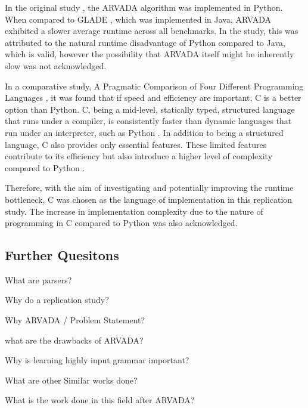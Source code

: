 In the original study \cite{kulkarniLearningHighlyRecursive2021}, the ARVADA algorithm was implemented in Python. When compared to GLADE \cite{bastaniSynthesizingProgramInput}, which was implemented in Java, ARVADA exhibited a slower average runtime across all benchmarks. In the study, this was attributed to the natural runtime disadvantage of Python compared to Java, which is valid, however the possibility that ARVADA itself might be inherently slow was not acknowledged.

\vspace{\baselineskip}

In a comparative study, A Pragmatic Comparison of Four Different Programming Languages \cite{aliPragmaticComparisonFour2021}, it was found that if speed and efficiency are important, C is a better option than Python. C, being a mid-level, statically typed, structured language that runs under a compiler, is consistently faster than dynamic languages that run under an interpreter, such as Python \cite{kumarPythonLanguageComparison2022}. In addition to being a structured language, C also provides only essential features. These limited features contribute to its efficiency but also introduce a higher level of complexity compared to Python \cite{aliPragmaticComparisonFour2021, kumarPythonLanguageComparison2022}.

\vspace{\baselineskip}

Therefore, with the aim of investigating and potentially improving the runtime bottleneck, C was chosen as the language of implementation in this replication study. The increase in implementation complexity due to the nature of programming in C compared to Python was also acknowledged.

\subsection{Further Quesitons}

What are parsers?

Why do a replication study?

Why ARVADA / Problem Statement?

what are the drawbacks of ARVADA?

Why is learning highly input grammar important?

What are other Similar works done?

What is the work done in this field after ARVADA?



